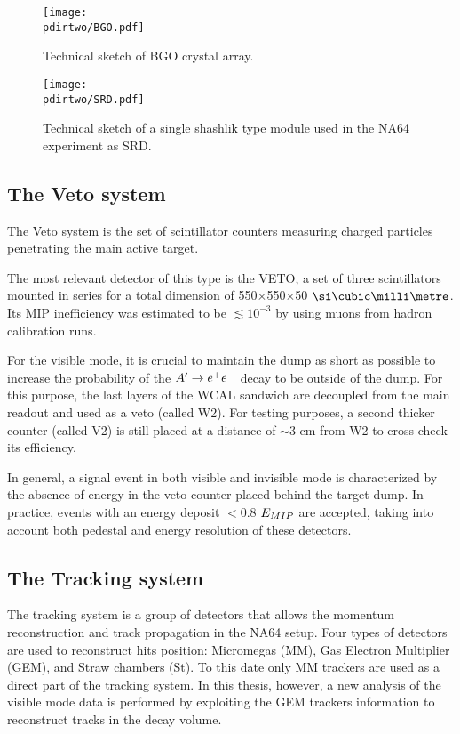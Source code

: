 \begin{figure}[bth!]
\centering
\texttt{[image: \\pdirtwo/BGO.pdf]}
\caption[BGO sketch]{Technical sketch of BGO crystal array.}
\label{fig:bgo-sketch}
\end{figure}

\begin{figure}[bth!]
\centering
\texttt{[image: \\pdirtwo/SRD.pdf]}
\caption[SRD sketch]{Technical sketch of a single shashlik type module used in the NA64 experiment as SRD.}
\label{fig:srd-sketch}
\end{figure}

\subsection{The Veto system}
\label{ch2:sec:detectors-veto}

The Veto system is the set of scintillator counters measuring charged particles penetrating the main active target.

The most relevant detector of this type is the VETO, a set of three scintillators mounted in series for a total dimension of 550$\times$550$\times$50 $\mmc$. Its MIP inefficiency was estimated to be $\lesssim 10^{-3}$ by using muons from hadron calibration runs.

For the visible mode, it is crucial to maintain the dump as short as possible to increase the probability of the $A' \to e^+e^-$ decay to be outside of the dump. For this purpose, the last layers of the WCAL sandwich are decoupled from the main readout and used as a veto (called W2). For testing purposes, a second thicker counter (called V2) is still placed at a distance of $\sim3$ \si{cm} from W2 to cross-check its efficiency.

In general, a signal event in both visible and invisible mode is characterized by the absence of energy in the veto counter placed behind the target dump. In practice, events with an energy deposit $<$0.8 $E_{MIP}$ are accepted, taking into account both pedestal and energy resolution of these detectors.

\subsection{The Tracking system}
\label{ch2:sec:detectors-tracking}

The tracking system is a group of detectors that allows the momentum reconstruction and track propagation in the NA64 setup. Four types of detectors are used to reconstruct hits position: Micromegas (MM), Gas Electron Multiplier (GEM), and Straw chambers (St). To this date only MM trackers are used as a direct part of the tracking system. In this thesis, however, a new analysis of the visible mode data is performed by exploiting the GEM trackers information to reconstruct tracks in the decay volume.

